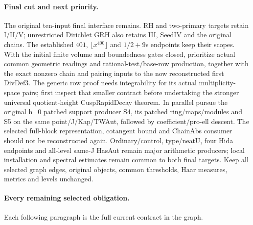 \paragraph{Final cut and next priority.}
The original ten-input final interface remains. RH and
two-primary targets retain I/II/V; unrestricted Dirichlet GRH
also retains III, SeedIV and the original chains. The established
$401$, $\lfloor x^{400}\rfloor$ and $1/2+9\epsilon$ endpoints
keep their scopes.
With the initial finite volume and boundedness gates closed, prioritize actual common geometric readings and rational-test/\allowbreak{}base-row production, together with the exact nonzero chain and pairing inputs to the now reconstructed first DivDef3. The generic row proof needs integrability for its actual multiplicity-space pairs; first inspect that smaller contract before undertaking the stronger universal quotient-height CuspRapidDecay theorem. In parallel pursue the original h=0 patched support producer S4, its patched ring/\allowbreak{}maps/\allowbreak{}modules and S5 on the same point/\allowbreak{}J/\allowbreak{}Kap/\allowbreak{}TWAut, followed by coefficient/\allowbreak{}pro-ell descent. The selected full-block representation, cotangent bound and ChainAbs consumer should not be reconstructed again. Ordinary/\allowbreak{}control, type/\allowbreak{}neatU, four Hida endpoints and all-level same-J HasAut remain major arithmetic producers; local installation and spectral estimates remain common to both final targets. Keep all selected graph edges, original objects, common thresholds, Haar measures, metrics and levels unchanged.

\paragraph{Every remaining selected obligation.}
Each following paragraph is the full current contract in the graph.
